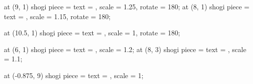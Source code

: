 \documentclass[12pt]{standalone}
\begin{document}
  \begin{shogiban}[board dimension = 8 cm, font scale = 2.5, book style, letter ranks]
    \pic at (9, 1) {shogi piece = {text = \shogiKingGote, scale = 1.25, rotate = 180}};
    \pic at (8, 1) {shogi piece = {text = \shogiGold, scale = 1.15, rotate = 180}};
    
    \pic at (10.5, 1) {shogi piece = {text = \shogiRook, scale = 1, rotate = 180}};

    \pic at (6, 1) {shogi piece = {text = \shogiRook, scale = 1.2}};
    \pic at (8, 3) {shogi piece = {text = \shogiPawn, scale = 1.1}};

    \pic at (-0.875, 9) {shogi piece = {text = \shogiGold, scale = 1}};
  \end{shogiban}
\end{document}
